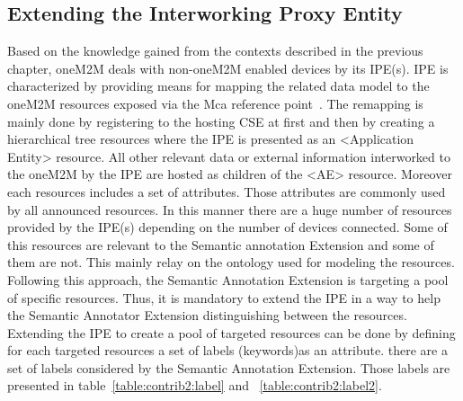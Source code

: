 \subsection{Extending the Interworking Proxy Entity}
\label{sec:contrib2:ipe}
Based on the knowledge gained from the contexts described in the previous chapter, oneM2M deals with non-oneM2M enabled devices by its IPE(s). IPE is characterized by providing means for mapping the related data model to the oneM2M resources exposed via the Mca reference point~\cite{presentationIPE}. The remapping is mainly done by registering to the hosting CSE at first and then by creating a hierarchical tree resources where the IPE is presented as an <Application Entity> resource. All other relevant data or external information interworked to the oneM2M by the IPE are hosted as children of the <AE> resource. Moreover each resources includes a set of attributes. Those attributes are commonly used by all announced resources. In this manner there are a huge number of resources provided by the IPE(s) depending on the number of devices connected. Some of this resources are relevant to the Semantic annotation Extension and some of them are not. This mainly relay on the ontology used for modeling the resources. Following this approach, the Semantic Annotation Extension is targeting a pool of specific resources. Thus, it is mandatory to extend the IPE in a way to help the Semantic Annotator Extension distinguishing between the resources. \PAR
Extending the IPE to create a pool of targeted resources can be done by defining for each targeted resources a set of labels (keywords)as an attribute. there are a set of labels considered by the Semantic Annotation Extension. Those labels are presented in table~\ref{table:contrib2:label} and ~\ref{table:contrib2:label2}.

